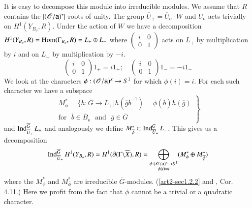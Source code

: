 It is easy to decompose this module into irreducible modules. We assume that $R$ contains the $|(\mathscr{O}/\mathsf{a})^{*}|$-roots of unity. The group $\overline{U}_{+}=\overline{U}_{o}\cdot W$ and $U_{o}$ acts trivially on $H^{1}(Y_{B_{o}},R)$. Under the action of $W$ we have a decomposition $H^{1}(Y_{B_{o}},R)=\operatorname{Hom}(\Gamma_{B_{o}},R)=L_{+}\oplus L_{-}$ where $\left(\begin{smallmatrix} i & 0\\ 0 & 1\end{smallmatrix}\right)$ acts on $L_{+}$ by multiplication by $i$ and on $L_{-}$ by multiplication by $-i$.
$$
\left(
\begin{matrix}
i & 0\\
0 & 1
\end{matrix}
\right)
1_{+}=i1_{+};\quad \left(
\begin{matrix}
i & 0\\
0 & 1
\end{matrix}
\right)1_{-}=-i 1_{-}
$$
We look at the characters $\phi:(\mathscr{O}/\mathsf{a})^{x}\to S^{1}$ for which $\phi(i)=i$. For each such character we have a subspace
$$
\left.
\begin{array}{r}
M^{*}_{\phi}=\{h:\overline{G}\to L_{+}|h(\overline{g}\overline{b}^{-1})=\phi(\overline{b})h(\overline{g})\\
\text{for~ } \overline{b}\in \overline{B}_{o}\text{~ and~ } \overline{g}\in \overline{G}
\end{array}
\right\}
$$
and $\operatorname{Ind}^{\overline{G}}_{\overline{U}_{+}}L_{+}$ and analogously we define $M^{*}_{\overline{\phi}}\subset \operatorname{Ind}^{G}_{\overline{U}_{+}}L_{-}$. This gives us a decomposition
\setcounter{equation}{0}
\begin{equation}
\operatorname{Ind}^{\overline{G}}_{\overline{U}_{+}}H^{1}(Y_{B_{o}},R)=H^{1}(\partial (\Gamma\backslash \overline{X}),R)=\bigoplus\limits_{\substack{\phi:(\mathscr{O}/\mathsf{a})^{x}\to S^{1}\\ \phi(i)=i}}(M^{*}_{\phi}\oplus M^{*}_{\overline{\phi}})\label{art2-eq1.2.1}
\end{equation}\pageoriginale
where the $M^{*}_{\phi}$ and $M^{*}_{\overline{\phi}}$ are irreducible $\overline{G}$-modules. (\ref{art2-sec1.2.2} and \cite{art2-key25}, Cor. 4.11.) Here we profit from the fact that $\phi$ cannot be a trivial or a quadratic character.

\setcounter{subsubsection}{1}
